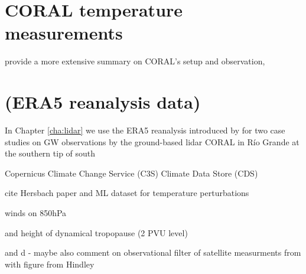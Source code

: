 




\section{CORAL temperature measurements} 
\label{sec:coral}

\textcite{kaifler_compact_2021} provide a more extensive summary on CORAL's setup and observation,


\section{(ERA5 reanalysis data)}

In Chapter \ref{cha:lidar} we use the ERA5 reanalysis introduced by \textcite[]{hersbach_era5_2020} for two case studies on GW observations by the ground-based lidar CORAL in Río Grande at the southern tip of south 

Copernicus Climate Change Service (C3S) Climate Data Store (CDS)

cite Hersbach paper and ML dataset for temperature perturbations 

winds on 850hPa

and height of dynamical tropopause (2 PVU level)

and d
- maybe also comment on observational filter of satellite measurments from with figure from Hindley